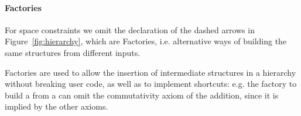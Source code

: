 \documentclass{easychair}
\begin{document}
\paragraph{Factories}
For space constraints we omit the declaration of the dashed arrows in
Figure~\ref{fig:hierarchy}, which are Factories, i.e. alternative
ways of building the same structures from different inputs.

Factories are used to allow the insertion of intermediate
structures in a hierarchy without breaking user code, as well as to
implement shortcuts: e.g. the factory to build a  from a
 can omit the commutativity axiom
of the addition, since it is implied by the other axioms.


\end{document}
